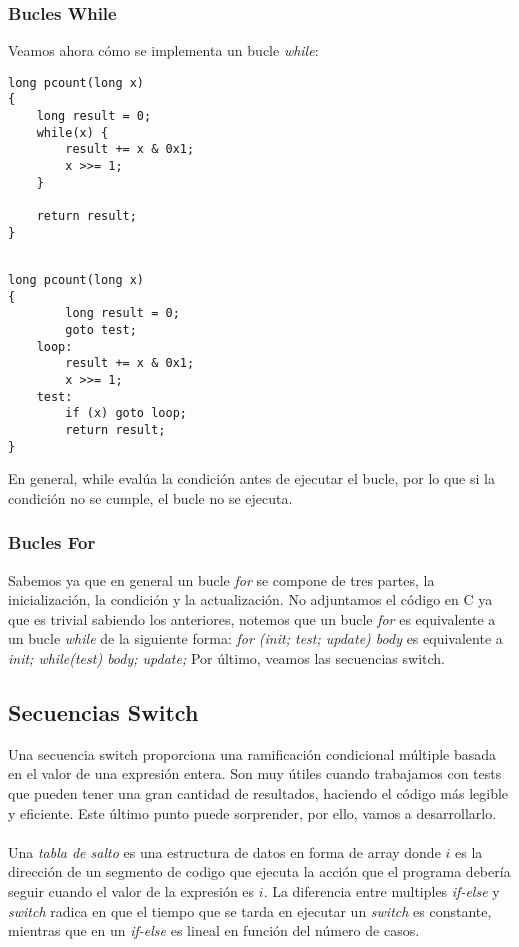 \subsubsection{Bucles While}
\begin{ejemplo}
	Veamos ahora cómo se implementa un bucle \textit{while}:
	\begin{center}
		\begin{minipage}{0.45\textwidth}
			\begin{verbatim}
long pcount(long x)
{
    long result = 0;
    while(x) {
        result += x & 0x1;
        x >>= 1;
    }

    return result;
}
\end{verbatim}
		\end{minipage}
		\begin{minipage}{0.45\textwidth}
			\begin{verbatim}

long pcount(long x)
{
        long result = 0;
        goto test;
    loop:
        result += x & 0x1;
        x >>= 1;
    test:
        if (x) goto loop;
        return result;
}
        \end{verbatim}

		\end{minipage}
	\end{center}
\end{ejemplo}
En general, while evalúa la condición antes de ejecutar el bucle, por lo que si la condición no se cumple, el bucle no se ejecuta.
\subsubsection{Bucles For}
Sabemos ya que en general un bucle \textit{for} se compone de tres partes, la inicialización, la condición y la actualización.
No adjuntamos el código en C ya que es trivial sabiendo los anteriores, notemos que un bucle \textit{for} es equivalente a un bucle \textit{while} de la siguiente forma:
\textit{for (init; test; update) body} es equivalente a \textit{init; while(test) {body; update;}}
Por último, veamos las secuencias switch.
\subsection{Secuencias Switch}
Una secuencia switch proporciona una ramificación condicional múltiple basada en el valor de una expresión entera.
Son muy útiles cuando trabajamos con tests que pueden tener una gran cantidad de resultados, haciendo el código más legible
y eficiente. Este último punto puede sorprender, por ello, vamos a desarrollarlo.
\\ \\
Una \textit{tabla de salto} es una estructura de datos en forma de array donde $i$ es la dirección de un segmento de codigo que ejecuta la acción
que el programa debería seguir cuando el valor de la expresión es $i$. La diferencia entre multiples \textit{if-else} y \textit{switch} radica en
que el tiempo que se tarda en ejecutar un \textit{switch} es constante, mientras que en un \textit{if-else} es lineal en función del número de casos.

